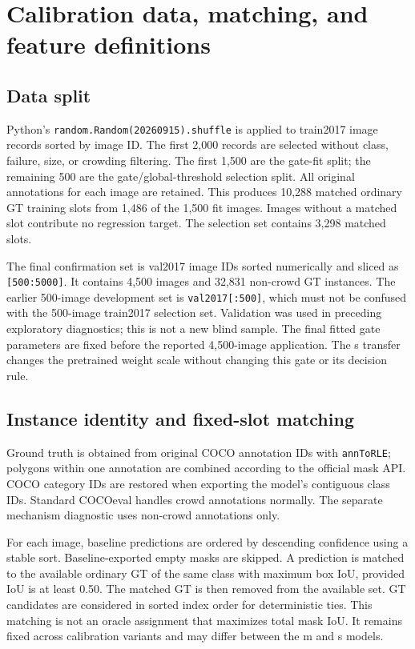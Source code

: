 \documentclass[11pt,a4paper]{article}
\begin{document}
\section{Calibration data, matching, and feature definitions}
\subsection{Data split}
Python's \texttt{random.Random(20260915).shuffle} is applied to train2017 image records sorted by image ID. The first 2,000 records are selected without class, failure, size, or crowding filtering. The first 1,500 are the gate-fit split; the remaining 500 are the gate/global-threshold selection split. All original annotations for each image are retained. This produces 10,288 matched ordinary GT training slots from 1,486 of the 1,500 fit images. Images without a matched slot contribute no regression target. The selection set contains 3,298 matched slots.

The final confirmation set is val2017 image IDs sorted numerically and sliced as \texttt{[500:5000]}. It contains 4,500 images and 32,831 non-crowd GT instances. The earlier 500-image development set is \texttt{val2017[:500]}, which must not be confused with the 500-image train2017 selection set. Validation was used in preceding exploratory diagnostics; this is not a new blind sample. The final fitted gate parameters are fixed before the reported 4,500-image application. The s transfer changes the pretrained weight scale without changing this gate or its decision rule.

\subsection{Instance identity and fixed-slot matching}
Ground truth is obtained from original COCO annotation IDs with \texttt{annToRLE}; polygons within one annotation are combined according to the official mask API. COCO category IDs are restored when exporting the model's contiguous class IDs. Standard COCOeval handles crowd annotations normally. The separate mechanism diagnostic uses non-crowd annotations only.

For each image, baseline predictions are ordered by descending confidence using a stable sort. Baseline-exported empty masks are skipped. A prediction is matched to the available ordinary GT of the same class with maximum box IoU, provided IoU is at least 0.50. The matched GT is then removed from the available set. GT candidates are considered in sorted index order for deterministic ties. This matching is not an oracle assignment that maximizes total mask IoU. It remains fixed across calibration variants and may differ between the m and s models.
\end{document}
